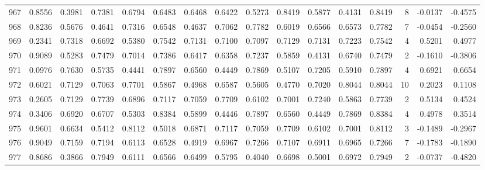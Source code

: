 \begin{tabular}{lrrrrrrrrrrrrrrr}
967 &      0.8556 &  0.3981 &  0.7381 &  0.6794 &  0.6483 &  0.6468 &  0.6422 &  0.5273 &  0.8419 &  0.5877 &   0.4131 &     0.8419 &      8 &                   -0.0137 &                    -0.4575 \\
968 &      0.8236 &  0.5676 &  0.4641 &  0.7316 &  0.6548 &  0.4637 &  0.7062 &  0.7782 &  0.6019 &  0.6566 &   0.6573 &     0.7782 &      7 &                   -0.0454 &                    -0.2560 \\
969 &      0.2341 &  0.7318 &  0.6692 &  0.5380 &  0.7542 &  0.7131 &  0.7100 &  0.7097 &  0.7129 &  0.7131 &   0.7223 &     0.7542 &      4 &                    0.5201 &                     0.4977 \\
970 &      0.9089 &  0.5283 &  0.7479 &  0.7014 &  0.7386 &  0.6417 &  0.6358 &  0.7237 &  0.5859 &  0.4131 &   0.6740 &     0.7479 &      2 &                   -0.1610 &                    -0.3806 \\
971 &      0.0976 &  0.7630 &  0.5735 &  0.4441 &  0.7897 &  0.6560 &  0.4449 &  0.7869 &  0.5107 &  0.7205 &   0.5910 &     0.7897 &      4 &                    0.6921 &                     0.6654 \\
972 &      0.6021 &  0.7129 &  0.7063 &  0.7701 &  0.5867 &  0.4968 &  0.6587 &  0.5605 &  0.4770 &  0.7020 &   0.8044 &     0.8044 &     10 &                    0.2023 &                     0.1108 \\
973 &      0.2605 &  0.7129 &  0.7739 &  0.6896 &  0.7117 &  0.7059 &  0.7709 &  0.6102 &  0.7001 &  0.7240 &   0.5863 &     0.7739 &      2 &                    0.5134 &                     0.4524 \\
974 &      0.3406 &  0.6920 &  0.6707 &  0.5303 &  0.8384 &  0.5899 &  0.4446 &  0.7897 &  0.6560 &  0.4449 &   0.7869 &     0.8384 &      4 &                    0.4978 &                     0.3514 \\
975 &      0.9601 &  0.6634 &  0.5412 &  0.8112 &  0.5018 &  0.6871 &  0.7117 &  0.7059 &  0.7709 &  0.6102 &   0.7001 &     0.8112 &      3 &                   -0.1489 &                    -0.2967 \\
976 &      0.9049 &  0.7159 &  0.7194 &  0.6113 &  0.6528 &  0.4919 &  0.6967 &  0.7266 &  0.7107 &  0.6911 &   0.6965 &     0.7266 &      7 &                   -0.1783 &                    -0.1890 \\
977 &      0.8686 &  0.3866 &  0.7949 &  0.6111 &  0.6566 &  0.6499 &  0.5795 &  0.4040 &  0.6698 &  0.5001 &   0.6972 &     0.7949 &      2 &                   -0.0737 &                    -0.4820 \\

\end{tabular}
